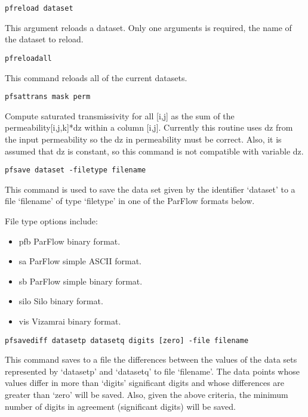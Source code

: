 \begin{description}
\item{\begin{verbatim}pfreload dataset\end{verbatim}}
This argument reloads a dataset. Only one arguments is required, the name of the dataset to reload.

\item{\begin{verbatim}pfreloadall\end{verbatim}}
This command reloads all of the current datasets.

\item{\begin{verbatim}pfsattrans mask perm\end{verbatim}}
Compute saturated transmissivity for all [i,j] as the sum of the 
permeability[i,j,k]*dz within a column [i,j]. Currently this routine
uses dz from the input permeability so the dz in permeability must be correct.
Also, it is assumed that dz is constant, so this command is not compatible with variable dz. 


\item{\begin{verbatim}pfsave dataset -filetype filename\end{verbatim}}
This command is used to save the data set given by the identifier
`dataset' to a file `filename' of type `filetype' in one of the
ParFlow formats below.

File type options include:
\begin{itemize}
\item{pfb}  ParFlow binary format.
\item{sa}  ParFlow simple ASCII format.
\item{sb}  ParFlow simple binary format.
\item{silo} Silo binary format.
\item{vis}  Vizamrai binary format.
\end{itemize}

\item{\begin{verbatim}pfsavediff datasetp datasetq digits [zero] -file filename
\end{verbatim}}
This command saves to a file the differences between the values
of the data sets represented by `datasetp' and `datasetq' to file
`filename'.  The data points whose values differ in more than         
`digits' significant digits and whose differences are greater than  
`zero' will be saved.  Also, given the above criteria, the
minimum number of digits in agreement (significant digits) will be    
saved.


\end{description}
